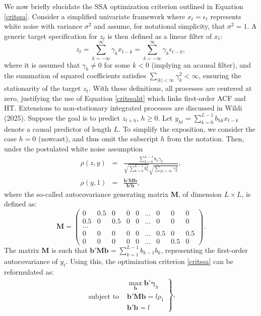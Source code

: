 \documentclass[11pt,a4paper]{article}
\begin{document}
We now briefly elucidate the SSA optimization criterion outlined in Equation \ref{critssa}. Consider a simplified univariate framework where $x_t=\epsilon_t$ represents white noise with variance $\sigma^2$ and assume, for notational simplicity, that $\sigma^2=1$. A generic target specification for $z_t$ is then defined as a linear filter of $x_t$:
\[z_t=\sum_{k=-\infty}^\infty \gamma_k x_{t-k}=\sum_{k=-\infty}^\infty \gamma_k \epsilon_{t-k},\] 
where it is assumed that $\gamma_k\neq 0$ for some $k<0$ (implying an acausal filter), and the summation of squared coefficients satisfies $\sum_{|k|<\infty}\gamma_k^2<\infty$, ensuring the stationarity of the target $z_t$. With these definitions, all processes are centered at zero, justifying the use of Equation \ref{critssaht} which links first-order ACF and HT. Extensions to non-stationary integrated processes are discussed in Wildi (2025). Suppose the goal is to predict  $z_{t+h}$, $h\geq 0$. Let  $y_{h t}=\sum_{k=0}^{L-1} b_{h k}x_{t-k}$  denote a causal predictor of length $L$.  To simplify the exposition, we consider the case $h=0$ (nowcast), and thus omit the subscript $h$ from the notation. Then, under the postulated white noise assumption
\begin{eqnarray*}
\rho(z,y)&=&\frac{\sum_{k=0}^{L-1}b_k\gamma_k}{\sqrt{\sum_{k=0}^{L-1}b_k^2}\sqrt{\sum_{|k|<\infty}\gamma_k^2}},\\
\rho(y,1)&=&\frac{\mathbf{b}'\mathbf{Mb}}{\mathbf{b}'\mathbf{b}},
\end{eqnarray*} 
where the so-called autocovariance generating matrix $\mathbf{M}$, of dimension $L\times L$, is defined as:
\[
\mathbf{M}=\left(\begin{array}{ccccccccc}0&0.5&0&0&0&...&0&0&0\\
0.5&0&0.5&0&0&...&0&0&0\\
...&&&&&&&&\\
0&0&0&0&0&...&0.5&0&0.5\\
0&0&0&0&0&...&0&0.5&0
\end{array}\right).
\]
The matrix $\mathbf{M}$ is such that $\mathbf{b}'\mathbf{Mb}=\sum_{k=1}^{L-1}b_{k-1}b_k$, representing the first-order autocovariance of $y_t$.  Using this, the optimization criterion \ref{critssa} can be reformulated as:
\begin{eqnarray}\label{crit1}
\left.\begin{array}{cc}
&\max_{\mathbf{b}}\mathbf{b}'\boldsymbol{\gamma}_{h}\\
\textrm{subject~to~}&\mathbf{b}'\mathbf{Mb}=l\rho_1\\
&\mathbf{b}'\mathbf{b}=l
\end{array}\right\},
\end{eqnarray}
\end{document}

